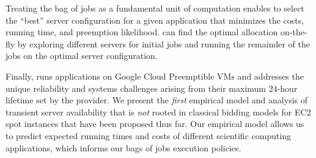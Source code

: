 
%
Treating the bag of jobs as a fundamental unit of computation enables \sysname to select the ``best'' server configuration for a given application that minimizes the costs, running time, and preemption likelihood.
\sysname can find the optimal allocation on-the-fly by exploring different servers for initial jobs and running the remainder of the jobs on the optimal server configuration. 

Finally, \sysname runs applications on Google Cloud Preemptible VMs and addresses the unique reliability and systems challenges arising from their maximum 24-hour lifetime set by the provider.
We present the \emph{first} empirical model and analysis of transient server availability that is \emph{not} rooted in classical bidding models for EC2 spot instances that have been proposed thus far. Our empirical model allows us to predict expected running times and costs of different scientific computing applications, which informs our bags of jobs execution policies.


